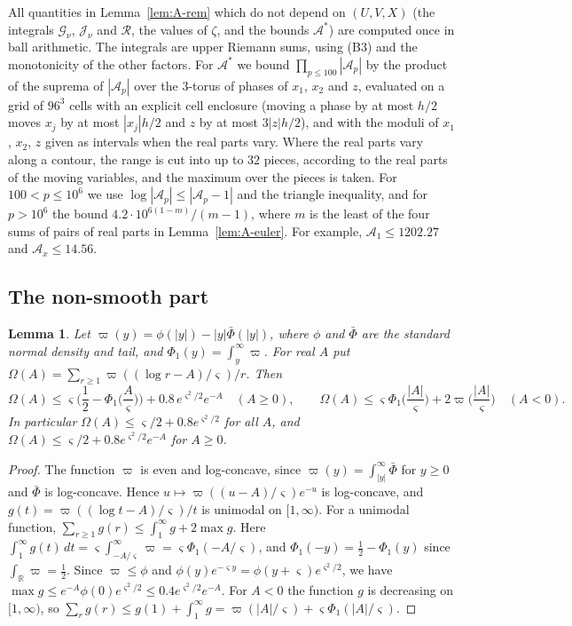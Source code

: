 \documentclass[11pt]{amsart}
\numberwithin{equation}{section}
\newtheorem{lemma}[theorem]{Lemma}
\theoremstyle{definition}
\theoremstyle{remark}
\begin{document}
All quantities in Lemma~\ref{lem:A-rem} which do not depend on $(U, V, X)$ (the integrals $\mathcal G_\nu$, $\mathcal J_\nu$ and $\mathcal R$, the values of $\zeta$, and the bounds $\mathcal A^*$) are computed once in ball arithmetic.
The integrals are upper Riemann sums, using (B3) and the monotonicity of the other factors.
For $\mathcal A^*$ we bound $\prod_{p\leq100}|\mathcal A_p|$ by the product of the suprema of $|\mathcal A_p|$ over the $3$-torus of phases of $x_1$, $x_2$ and $z$, evaluated on a grid of $96^3$ cells with an explicit cell enclosure (moving a phase by at most $h/2$ moves $x_j$ by at most $|x_j|h/2$ and $z$ by at most $3|z|h/2$), and with the moduli of $x_1$, $x_2$, $z$ given as intervals when the real parts vary.
Where the real parts vary along a contour, the range is cut into up to $32$ pieces, according to the real parts of the moving variables, and the maximum over the pieces is taken.
For $100 < p \leq 10^6$ we use $\log|\mathcal A_p| \leq |\mathcal A_p - 1|$ and the triangle inequality, and for $p > 10^6$ the bound $4.2\cdot10^{6(1-m)}/(m - 1)$, where $m$ is the least of the four sums of pairs of real parts in Lemma~\ref{lem:A-euler}.
For example, $\mathcal A_1 \leq 1202.27$ and $\mathcal A_x \leq 14.56$.

\subsection{The non-smooth part}

\begin{lemma}\label{lem:A-bsum}
Let $\varpi(y) = \phi(|y|) - |y|\bar\Phi(|y|)$, where $\phi$ and $\bar\Phi$ are the standard normal density and tail, and $\Phi_1(y) = \int_y^\infty\varpi$.
For real $A$ put $\Omega(A) = \sum_{r\geq1}\varpi((\log r - A)/\varsigma)/r$.
Then
\[
\Omega(A) \leq \varsigma\Big(\frac12 - \Phi_1\Big(\frac A\varsigma\Big)\Big) + 0.8\,e^{\varsigma^2/2}e^{-A} \quad (A \geq 0), \qquad \Omega(A) \leq \varsigma\Phi_1\Big(\frac{|A|}\varsigma\Big) + 2\varpi\Big(\frac{|A|}\varsigma\Big) \quad (A < 0).
\]
In particular $\Omega(A) \leq \varsigma/2 + 0.8e^{\varsigma^2/2}$ for all $A$, and $\Omega(A) \leq \varsigma/2 + 0.8e^{\varsigma^2/2}e^{-A}$ for $A \geq 0$.
\end{lemma}

\begin{proof}
The function $\varpi$ is even and log-concave, since $\varpi(y) = \int_{|y|}^\infty\bar\Phi$ for $y \geq 0$ and $\bar\Phi$ is log-concave.
Hence $u \mapsto \varpi((u - A)/\varsigma)e^{-u}$ is log-concave, and $g(t) = \varpi((\log t - A)/\varsigma)/t$ is unimodal on $[1, \infty)$.
For a unimodal function, $\sum_{r\geq1}g(r) \leq \int_1^\infty g + 2\max g$.
Here $\int_1^\infty g(t)\,dt = \varsigma\int_{-A/\varsigma}^\infty\varpi = \varsigma\Phi_1(-A/\varsigma)$, and $\Phi_1(-y) = \frac12 - \Phi_1(y)$ since $\int_{\mathbb R}\varpi = \frac12$.
Since $\varpi \leq \phi$ and $\phi(y)e^{-\varsigma y} = \phi(y + \varsigma)e^{\varsigma^2/2}$, we have $\max g \leq e^{-A}\phi(0)e^{\varsigma^2/2} \leq 0.4e^{\varsigma^2/2}e^{-A}$.
For $A < 0$ the function $g$ is decreasing on $[1, \infty)$, so $\sum_rg(r) \leq g(1) + \int_1^\infty g = \varpi(|A|/\varsigma) + \varsigma\Phi_1(|A|/\varsigma)$.
\end{proof}
\end{document}
